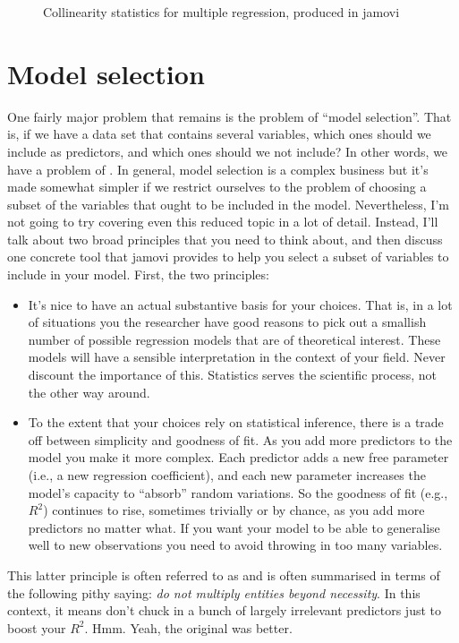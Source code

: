 \begin{figure}[!htb]
\begin{center}
\caption{Collinearity statistics for multiple regression, produced in jamovi }
\HR
\label{fig:reg7}
\end{center}
\end{figure}


\section{Model selection\label{sec:modelselreg}}

One fairly major problem that remains is the problem of ``model selection''. That is, if we have a data set that contains several variables, which ones should we include as predictors, and which ones should we not include? In other words, we have a problem of . In general, model selection is a complex business but it's made somewhat simpler if we restrict ourselves to the problem of choosing a subset of the variables that ought to be included in the model. Nevertheless, I'm not going to try covering even this reduced topic in a lot of detail. Instead, I'll talk about two broad principles that you need to think about, and then discuss one concrete tool that jamovi provides to help you select a subset of variables to include in your model. First, the two principles:
\begin{itemize}
\item It's nice to have an actual substantive basis for your choices. That is, in a lot of situations you the researcher have good reasons to pick out a smallish number of possible regression models that are of theoretical interest. These models will have a sensible interpretation in the context of your field. Never discount the importance of this. Statistics serves the scientific process, not the other way around. 
\item To the extent that your choices rely on statistical inference, there is a trade off between simplicity and goodness of fit. As you add more predictors to the model you make it more complex. Each predictor adds a new free parameter (i.e., a new regression coefficient), and each new parameter increases the model's capacity to ``absorb'' random variations. So the goodness of fit (e.g., $R^2$) continues to rise, sometimes trivially or by chance, as you add more predictors no matter what. If you want your model to be able to generalise well to new observations you need to avoid throwing in too many variables. 
\end{itemize}
This latter principle is often referred to as  and is often summarised in terms of the following pithy saying: {\it do not multiply entities beyond necessity}. In this context, it means don't chuck in a bunch of largely irrelevant predictors just to boost your $R^2$. Hmm. Yeah, the original was better. 

